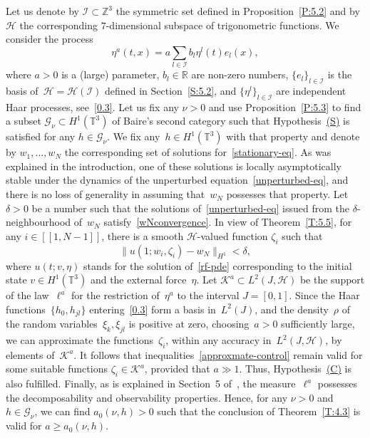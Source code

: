 \documentclass[JEP,XML,SOM,Unicode,ThmDefs]{cedram}
\let\mathcal\mathscr
\theoremstyle{plain}
\numberwithin{equation}{section}
\newcommand{\R}{{\mathbb R}}
\newcommand{\Z}{{\mathbb Z}}
\newcommand{\T}{{\mathbb T}}
\newcommand{\GG}{{\mathcal G}}
\newcommand{\HH}{{\mathcal H}}
\newcommand{\II}{{\mathcal I}}
\newcommand{\KK}{{\mathcal K}}
\begin{document}
\begin{example}
Let us denote by $\II\subset\Z^3$ the symmetric set defined in Proposition~\ref{P:5.2} and by~$\HH$ the corresponding $7$-dimensional subspace of trigonometric functions. We consider the process
\begin{equation*}
\eta^a(t,x)=a\sum_{l\in\II}b_l\eta^l(t)e_l(x),
\end{equation*}
where $a>0$ is a (large) parameter, $b_l\in\R$ are non-zero numbers, $\{e_l\}_{l\in\II}$ is the basis of~$\HH=\HH(\II)$ defined in Section~\ref{S:5.2}, and $\{\eta^l\}_{l\in\II}$ are independent Haar processes, see~\eqref{0.3}. Let us fix any $\nu>0$ and use Proposition~\ref{P:5.3} to find a subset $\GG_\nu\subset H^1(\T^3)$ of Baire's second category such that Hypothesis~\hyperlink{S}{(S)} is satisfied for any $h\in\GG_\nu$. We fix any~$h\in H^1(\T^3)$ with that property and denote by $w_1,\dots,w_N$ the corresponding set of solutions for~\eqref{stationary-eq}. As was explained in the introduction, one of these solutions is locally asymptotically stable under the dynamics of the unperturbed equation~\eqref{unperturbed-eq}, and there is no loss of generality in assuming that~$w_N$ possesses that property. Let $\delta>0$ be a number such that the solutions of~\eqref{unperturbed-eq} issued from the $\delta$-neighbourhood of~$w_N$ satisfy~\eqref{wNconvergence}. In view of Theorem~\ref{T:5.5}, for any $i\in[\![1,N-1]\!]$, there is a smooth $\HH$-valued function $\zeta_i$ such that
\begin{equation} \label{approxmate-control}
\|u(1;w_i,\zeta_i)-w_N\|_{H^1}<\delta,
\end{equation}
where $u(t;v,\eta)$ stands for the solution of~\eqref{rf-pde} corresponding to the initial state $v\in H^1(\T^3)$ and the external force~$\eta$. Let $\KK^a\subset L^2(J,\HH)$ be the support of the law~$\ell^a$ for the restriction of~$\eta^a$ to the interval $J=[0,1]$. Since the Haar functions~$\{h_0,h_{jl}\}$ entering~\eqref{0.3} form a basis in~$L^2(J)$, and the density~$\rho$ of the random variables~$\xi_k,\xi_{jl}$ is positive at zero, choosing~$a>0$ sufficiently large, we can approximate the functions~$\zeta_i$, within any accuracy in~$L^2(J,\HH)$, by elements of~$\KK^a$. It follows that inequalities~\eqref{approxmate-control} remain valid for some suitable functions $\zeta_i\in\KK^a$, provided that $a\gg1$. Thus, Hypothesis~\hyperlink{C}{(C)} is also fulfilled. Finally, as is explained in Section~5 of~\cite{KNS-2020}, the measure~$\ell^a$ possesses the decomposability and observability properties. Hence, for any $\nu>0$ and $h\in \GG_\nu$, we can find $a_0(\nu,h)>0$ such that the conclusion of Theorem~\ref{T:4.3} is valid for $a\ge a_0(\nu,h)$.
\end{example}
\end{document}
